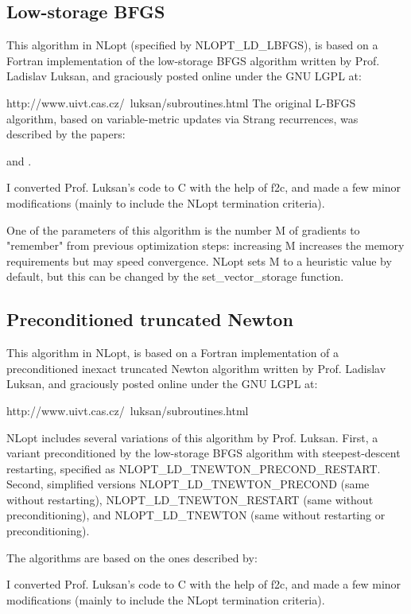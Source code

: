 \subsection{Low-storage BFGS}
This algorithm in NLopt (specified by NLOPT\_LD\_LBFGS), is based on a Fortran implementation of the low-storage BFGS algorithm written by Prof. Ladislav Luksan, and graciously posted online under the GNU LGPL at: 

http://www.uivt.cas.cz/~luksan/subroutines.html 
The original L-BFGS algorithm, based on variable-metric updates via Strang recurrences, was described by the papers: 

\cite{Nocedal_1980} and \cite{Liu_1989}.


I converted Prof. Luksan's code to C with the help of f2c, and made a few minor modifications (mainly to include the NLopt termination criteria). 

One of the parameters of this algorithm is the number M of gradients to "remember" from previous optimization steps: increasing M increases the memory requirements but may speed convergence. NLopt sets M to a heuristic value by default, but this can be changed by the set\_vector\_storage function. 





\subsection{Preconditioned truncated Newton}
This algorithm in NLopt, is based on a Fortran implementation of a preconditioned inexact truncated Newton algorithm written by Prof. Ladislav Luksan, and graciously posted online under the GNU LGPL at: 

http://www.uivt.cas.cz/~luksan/subroutines.html 

NLopt includes several variations of this algorithm by Prof. Luksan. First, a variant preconditioned by the low-storage BFGS algorithm with steepest-descent restarting, specified as NLOPT\_LD\_TNEWTON\_PRECOND\_RESTART. Second, simplified versions NLOPT\_LD\_TNEWTON\_PRECOND (same without restarting), NLOPT\_LD\_TNEWTON\_RESTART (same without preconditioning), and NLOPT\_LD\_TNEWTON (same without restarting or preconditioning). 

The algorithms are based on the ones described by: \cite{Dembo_1982}

I converted Prof. Luksan's code to C with the help of f2c, and made a few minor modifications (mainly to include the NLopt termination criteria). 

